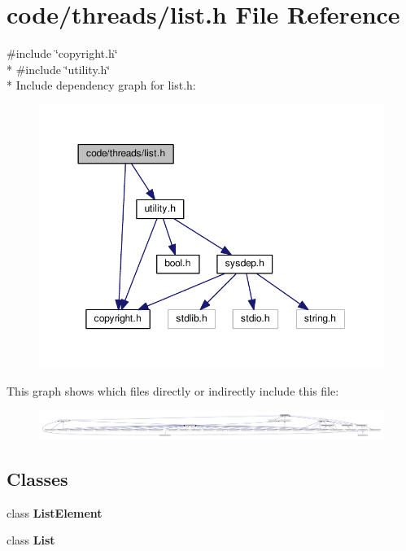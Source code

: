 \section{code/threads/list.h File Reference}
\label{list_8h}
{\ttfamily \#include \char`\"{}copyright.\+h\char`\"{}}\\*
{\ttfamily \#include \char`\"{}utility.\+h\char`\"{}}\\*
Include dependency graph for list.\+h\+:
\nopagebreak
\begin{figure}[H]
\begin{center}
\leavevmode
\includegraphics[width=350pt]{list_8h__incl}
\end{center}
\end{figure}
This graph shows which files directly or indirectly include this file\+:
\nopagebreak
\begin{figure}[H]
\begin{center}
\leavevmode
\includegraphics[width=350pt]{list_8h__dep__incl}
\end{center}
\end{figure}
\subsection*{Classes}
\begin{DoxyCompactItemize}
\item 
class {\bf List\+Element}
\item 
class {\bf List}
\end{DoxyCompactItemize}
